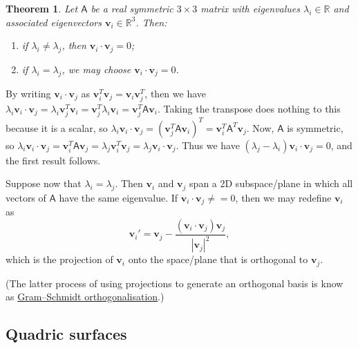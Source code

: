 \documentclass[10pt,notitlepage]{revtex4-1}
\newtheorem{theorem}{Theorem}[section]
\newenvironment{proof}[1][Proof]{\begin{trivlist}
\item[\hskip \labelsep {\bfseries #1}]}{\end{trivlist}}
\newcommand{\vb}{\boldsymbol{v}}
\begin{document}
\begin{theorem}
	Let $\mathsf{A}$ be a real symmetric $3\times3$ matrix with eigenvalues
	$\lambda_i\in\mathbb{R}$ and associated eigenvectors $\vb_i
	\in\mathbb{R}^3$. Then:
	\begin{enumerate}
		\item if $\lambda_i \neq \lambda_j$, then $\vb_i \cdot \vb_j = 0$;
		\item if $\lambda_i = \lambda_j$, we may choose $\vb_i \cdot \vb_j = 0$.
	\end{enumerate}
\end{theorem}
\begin{proof}
	By writing $\vb_i \cdot \vb_j$ as $\vb_i^T \vb_j = \vb_i \vb_j^T$, then we
	have $\lambda_i \vb_i\cdot\vb_j = \lambda_i \vb_j^T \vb_i = \vb_j^T
	\lambda_i \vb_i = \vb_j^T \mathsf{A}\vb_i$. Taking the transpose does
	nothing to this because it is a scalar, so $\lambda_i \vb_i \cdot \vb_j =
	(\vb_j^T \mathsf{A} \vb_i)^T = \vb_i^T \mathsf{A}^T \vb_j$. Now,
	$\mathsf{A}$ is symmetric, so $\lambda_i \vb_i \cdot \vb_j = \vb_i^T
	\mathsf{A} \vb_j = \lambda_j \vb_i^T \vb_j = \lambda_j \vb_i\cdot \vb_j$.
	Thus we have $(\lambda_j-\lambda_i)\vb_i \cdot\vb_j =0$, and the first
	result follows.
	
	Suppose now that $\lambda_i = \lambda_j$. Then $\vb_i$ and $\vb_j$ span a 2D
	subspace/plane in which all vectors of $\mathsf{A}$ have the same
	eigenvalue. If $\vb_i\cdot\vb_j \neq=0$, then we may redefine $\vb_i$ as
	\begin{equation}
		\vb_i' = \vb_j-\frac{(\vb_i \cdot \vb_j)\vb_j}{|\vb_j|^2},
	\end{equation}
	which is the projection of $\vb_i$ onto the space/plane that is orthogonal
	to $\vb_j$.
\end{proof}
(The latter process of using projections to generate an orthogonal basis is know
as \underline{Gram--Schmidt orthogonalisation}.)


\subsection{Quadric surfaces}
\end{document}
